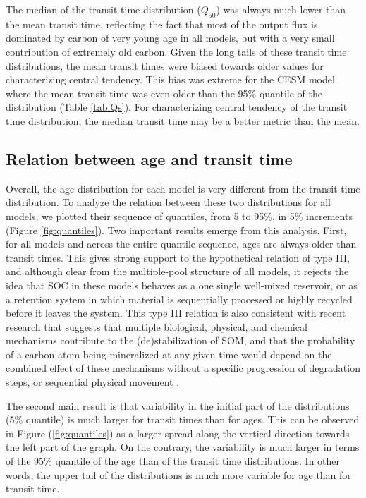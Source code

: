 \documentclass[draft,linenumbers]{agujournal}
\begin{document}
The median of the transit time distribution ($Q_{50}$) was always much lower than the mean transit time, reflecting the fact that most of the output flux is dominated by carbon of very young age in all models, but with a very small contribution of extremely old carbon. Given the long tails of these transit time distributions, the mean transit times were biased towards older values for characterizing central tendency. This bias was extreme for the CESM model where the mean transit time was even older than the 95\% quantile of the distribution (Table \ref{tab:Qs}). For characterizing central tendency of the transit time distribution, the median transit time may be a better metric than the mean.

\subsection{Relation between age and transit time}
Overall, the age distribution for each model is very different from the transit time distribution. To analyze the relation between these two distributions for all models, we plotted their sequence of  quantiles, from 5 to 95\%, in 5\% increments (Figure \ref{fig:quantiles}). Two important results emerge from this analysis. First, for all models and across the entire quantile sequence, ages are always older than transit times. This gives strong support to the hypothetical relation of type III, and although clear from the multiple-pool structure of all models, it  rejects the idea that SOC in these models behaves as a one single well-mixed reservoir, or as a retention system in which material is sequentially processed or highly recycled before it leaves the system. This type III relation is also consistent with recent research that suggests that multiple biological, physical, and chemical mechanisms contribute to the (de)stabilization of SOM, and that the probability of a carbon atom being mineralized at any given time would depend on the combined effect of these mechanisms without a specific progression of degradation steps, or sequential physical movement \citep{LehmannKleber}. 

The second main result is that variability in the initial part of the distributions (5\% quantile) is much larger for transit times than for ages. This can be observed in Figure (\ref{fig:quantiles}) as a larger spread along the vertical direction towards the left part of the graph. On the contrary, the variability is much larger in terms of the 95\% quantile of the age than of the transit time distributions. In other words, the upper tail of the distributions is much more variable for age than for transit time. 
\end{document}
